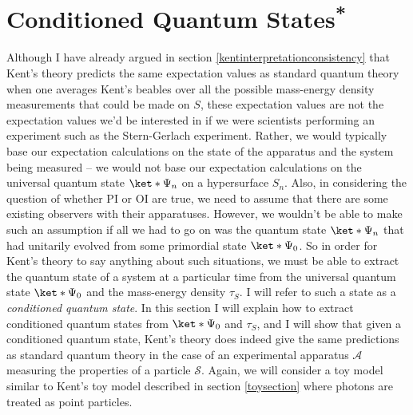 \documentclass[12pt]{report}
\begin{document}


\section{Conditioned Quantum States\textsuperscript{*}\label{KentconsistentQT}}
Although I have already argued in section \ref{kentinterpretationconsistency} that Kent's theory predicts the same expectation values as standard quantum theory when one averages Kent's beables over all the possible mass-energy density measurements that could be made on $S$, these expectation values are not the expectation values we'd be interested in if we were scientists performing an experiment such as the Stern-Gerlach experiment. Rather, we would typically base our expectation calculations on the state of the apparatus and the system being measured -- we would not base our expectation calculations on the  universal quantum state $\ket*{\Psi_n}$ on a hypersurface $S_n$. Also, in considering the question of whether PI or OI are true, we need to assume that there are some existing observers with their apparatuses. However, we wouldn't be able to make such an assumption if all we had to go on was the quantum state $\ket*{\Psi_n}$ that had unitarily evolved from some primordial state $\ket*{\Psi_0}$. So in order for Kent's theory to say anything about such situations, we must be able to extract the quantum state of a system at a particular time from the universal quantum state $\ket*{\Psi_0}$ and the mass-energy density $\tau_S$. I will refer to such a state as a \emph{conditioned quantum state}. In this section I will explain how to extract conditioned quantum states from $\ket*{\Psi_0}$ and $\tau_S$, and I will show that given a conditioned quantum state, Kent's theory does indeed give the same predictions as standard quantum theory in the case of an experimental apparatus $\mathcal{A}$ measuring the properties of a particle $\mathcal{S}$. Again, we will consider a toy model similar to Kent's toy model described in section \ref{toysection} where photons are treated as point particles. 
 
\end{document}
